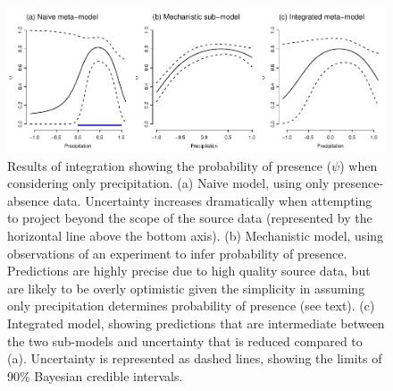 
\begin{figure}[tb]
	\includegraphics{ex1_precip.pdf}
	\caption{Results of integration showing the probability of presence (\(\psi\)) when considering only precipitation.
	(a) Naive model, using only presence-absence data. Uncertainty increases dramatically when attempting to project beyond the scope of the source data (represented by the horizontal line above the bottom axis).
	(b) Mechanistic model, using observations of an experiment to infer probability of presence. Predictions are highly precise due to high quality source data, but are likely to be overly optimistic given the simplicity in assuming only precipitation determines probability of presence (see text).
	(c) Integrated model, showing predictions that are intermediate between the two sub-models and uncertainty that is reduced compared to (a).
	Uncertainty is represented as dashed lines, showing the limits of 90\% Bayesian credible intervals.}
	\label{fig:ex1_precip}
\end{figure}




